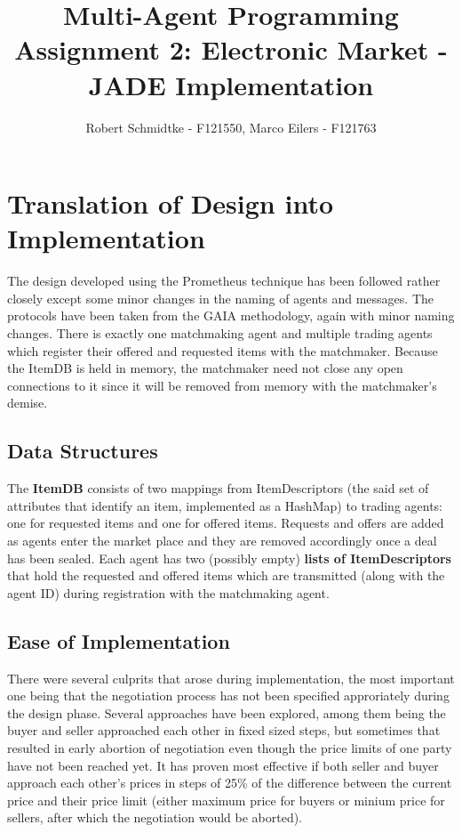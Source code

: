 \documentclass[a4paper,11pt]{article}
\begin{document}
\title{Multi-Agent Programming\\Assignment 2: Electronic Market - JADE Implementation}
\author{Robert Schmidtke - F121550, Marco Eilers - F121763}

\maketitle
\newpage

\section{Translation of Design into Implementation}
The design developed using the Prometheus technique has been followed rather closely except some minor changes in the naming of agents and messages. The protocols have been taken from the GAIA methodology, again with minor naming changes. There is exactly one matchmaking agent and multiple trading agents which register their offered and requested items with the matchmaker. Because the ItemDB is held in memory, the matchmaker need not close any open connections to it since it will be removed from memory with the matchmaker's demise.

\subsection{Data Structures}
The \textbf{ItemDB} consists of two mappings from ItemDescriptors (the said set of attributes that identify an item, implemented as a HashMap) to trading agents: one for requested items and one for offered items. Requests and offers are added as agents enter the market place and they are removed accordingly once a deal has been sealed. Each agent has two (possibly empty) \textbf{lists of ItemDescriptors} that hold the requested and offered items which are transmitted (along with the agent ID) during registration with the matchmaking agent.

\subsection{Ease of Implementation}
There were several culprits that arose during implementation, the most important one being that the negotiation process has not been specified approriately during the design phase. Several approaches have been explored, among them being the buyer and seller approached each other in fixed sized steps, but sometimes that resulted in early abortion of negotiation even though the price limits of one party have not been reached yet. It has proven most effective if both seller and buyer approach each other's prices in steps of 25\% of the difference between the current price and their price limit (either maximum price for buyers or minium price for sellers, after which the negotiation would be aborted).
\end{document}
